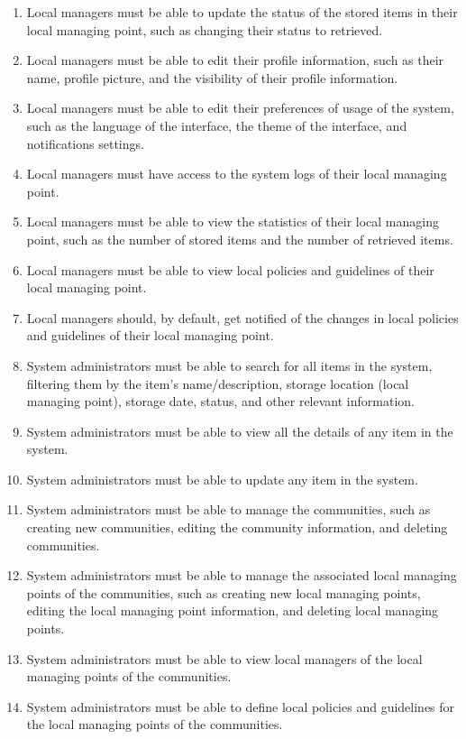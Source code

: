 \begin{enumerate}
    \item Local managers must be able to update the status of the stored items in their local managing point, such as changing their status to retrieved.
    \item Local managers must be able to edit their profile information, such as their name, profile picture, and the visibility of their profile information.
    \item Local managers must be able to edit their preferences of usage of the system, such as the language of the interface, the theme of the interface, and notifications settings.
    \item Local managers must have access to the system logs of their local managing point.
    \item Local managers must be able to view the statistics of their local managing point, such as the number of stored items and the number of retrieved items.
    \item Local managers must be able to view local policies and guidelines of their local managing point.
    \item Local managers should, by default, get notified of the changes in local policies and guidelines of their local managing point.
    \item System administrators must be able to search for all items in the system, filtering them by the item's name/description, storage location (local managing point), storage date, status, and other relevant information.
    \item System administrators must be able to view all the details of any item in the system.
    \item System administrators must be able to update any item in the system.
    \item System administrators must be able to manage the communities, such as creating new communities, editing the community information, and deleting communities.
    \item System administrators must be able to manage the associated local managing points of the communities, such as creating new local managing points, editing the local managing point information, and deleting local managing points.
    \item System administrators must be able to view local managers of the local managing points of the communities.
    \item System administrators must be able to define local policies and guidelines for the local managing points of the communities.

\end{enumerate}
